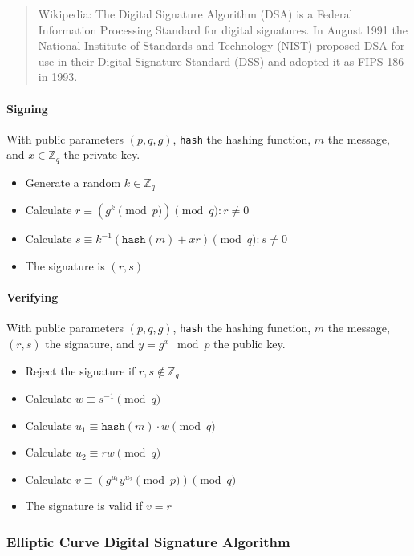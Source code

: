 \begin{quote}{Wikipedia:}
  The Digital Signature Algorithm (DSA) is a Federal Information Processing Standard
  for digital signatures. In August 1991 the National Institute of Standards and
  Technology (NIST) proposed DSA for use in their Digital Signature Standard (DSS)
  and adopted it as FIPS 186 in 1993.
\end{quote}

\paragraph{Signing}

With public parameters $(p, q, g)$, \texttt{hash} the hashing function,
$m$ the message, and $x \in \mathbb{Z}_q$ the private key.

\begin{itemize}
  \item Generate a random $k \in \mathbb{Z}_q$
  \item Calculate $r \equiv (g^k \pmod p) \pmod q : r \neq 0$
  \item Calculate $s \equiv k^{-1}(\texttt{hash}(m) + xr) \pmod q : s \neq 0$
  \item The signature is $(r, s)$
\end{itemize}

\paragraph{Verifying}

With public parameters $(p, q, g)$, \texttt{hash} the hashing function,
$m$ the message, $(r, s)$ the signature, and $y = g^x \mod p$ the public key.

\begin{itemize}
  \item Reject the signature if $r, s \notin \mathbb{Z}_q$
  \item Calculate $w \equiv s^{-1} \pmod q$
  \item Calculate $u_1 \equiv \texttt{hash}(m) \cdot w \pmod q$
  \item Calculate $u_2 \equiv rw \pmod q$
  \item Calculate $v \equiv (g^{u_1}y^{u_2} \pmod p) \pmod q$
  \item The signature is valid if $v = r$
\end{itemize}

\subsubsection{Elliptic Curve Digital Signature Algorithm}


